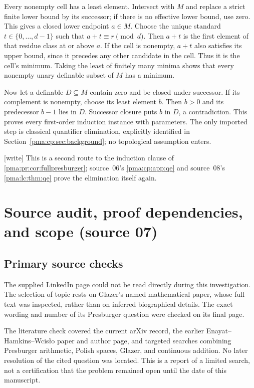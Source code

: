 \documentclass[11pt]{article}
\numberwithin{equation}{section}
\theoremstyle{definition}
\theoremstyle{remark}
\newcommand{\writetag}{\textup{\textsf{\small[write]}}}
\begin{document}
Every nonempty cell has a least element. Intersect with $M$ and replace
a strict finite lower bound by its successor; if there is no effective
lower bound, use zero. This gives a closed lower endpoint $a\in M$.
Choose the unique standard $t\in\{0,\ldots,d-1\}$ such that
$a+t\equiv r\pmod d$. Then $a+t$ is the first element of that residue
class at or above $a$. If the cell is nonempty, $a+t$ also satisfies its
upper bound, since it precedes any other candidate in the cell. Thus it
is the cell's minimum. Taking the least of finitely many minima shows that
every nonempty unary definable subset of $M$ has a minimum.

Now let a definable $D\subseteq M$ contain zero and be closed under
successor. If its complement is nonempty, choose its least element $b$.
Then $b>0$ and its predecessor $b-1$ lies in $D$. Successor closure
puts $b$ in $D$, a contradiction. This proves every first-order
induction instance with parameters. The only imported step is classical
quantifier elimination, explicitly identified in
Section~\ref{pma:cp:sec:background}; no topological assumption enters.

\noindent\writetag{} This is a second route to the induction clause of
\cref{pma:pr:cor:fullpresburger}; source~06's \cref{pma:cp:app:qe} and
source~08's \cref{pma:lc:thm:qe} prove the elimination itself again.

\section{Source audit, proof dependencies, and scope (source 07)}
\label{pma:cp:app:audit}

\subsection{Primary source checks}

The supplied LinkedIn page could not be read directly during this
investigation. The selection of topic rests on Glazer's named mathematical
paper, whose full text was inspected, rather than on inferred biographical
details. The exact wording and number of its Presburger question were
checked on its final page.

The literature check covered the current arXiv record, the earlier
Enayat--Hamkins--Wcis\l{}o paper and author page, and targeted searches
combining Presburger arithmetic, Polish spaces, Glazer, and continuous
addition. No later resolution of the cited question was located.
This is a report of a limited search, not a certification that the problem
remained open until the date of this manuscript.
\end{document}
